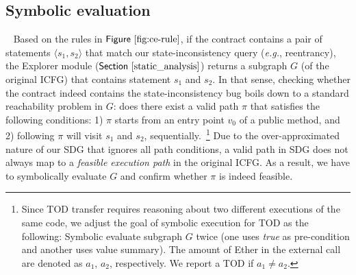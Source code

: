 \documentclass[conference, romanappendices]{tex/IEEEtran}
\theoremstyle{bfnote}
\newcommand{\explorer}{{\sc Explorer}\xspace}
\newcommand{\ether}{{Ether}\xspace}
\newcommand{\reentrancy}{{reentrancy}\xspace}
\newcommand{\si}{{state-inconsistency}\xspace}
\newcommand{\eg}{\textit{e.g.}}
\newcommand{\Fig}[1]{\ensuremath{\sf Figure~\ref{#1}}}
\newcommand{\Sect}[1]{\ensuremath{\sf Section~\ref{#1}}}
\begin{document}
 \subsection{\textbf{Symbolic evaluation}}
~\label{sec:sym-exe}
Based on the rules in \Fig{fig:ce-rule}, if the contract contains a pair of statements $\langle s_1, s_2 \rangle$ that match our \si query (\eg, \reentrancy), the \explorer module (\Sect{static_analysis}) returns a subgraph $G$ (of the original {ICFG\EndAccSupp{}}) that contains statement $s_1$ and $s_2$. 
In that sense, checking whether the contract indeed contains the \si bug boils down to a standard reachability problem in $G$: does there exist a valid path $\pi$ that satisfies the following conditions: 1) $\pi$ starts from an entry point $v_0$ of a public method, and 2) following $\pi$ will visit $s_1$ and $s_2$, sequentially.~\footnote{Since TOD transfer requires reasoning about two different executions of the same code, we adjust the goal of symbolic execution for TOD as the following: Symbolic evaluate subgraph $G$ twice (one uses \textit{true} as pre-condition and another uses value summary). The amount of \ether in the external call are denoted as $a_1$, $a_2$, respectively. We report a TOD if $a_1 \neq a_2$. }
Due to the over-approximated nature of our {SDG\EndAccSupp{}} that ignores all path conditions, a valid path in {SDG\EndAccSupp{}} does not always map to a \emph{feasible execution path} in the original ICFG. As a result, we have to symbolically evaluate $G$ and confirm whether $\pi$ is indeed feasible.
\end{document}
